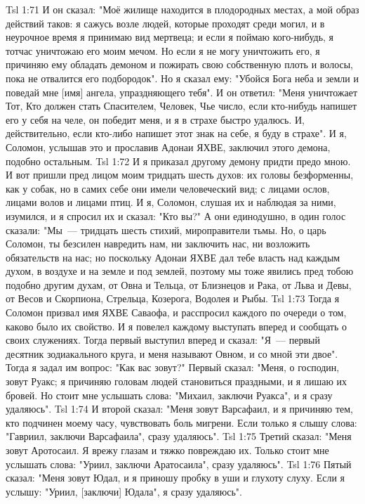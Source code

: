 \vs Tsl 1:71 
И он сказал: "Моё жилище находится в плодородных местах, а мой образ действий таков: я сажусь возле людей, которые проходят среди могил, и в неурочное время я принимаю вид мертвеца; и если я поймаю кого-нибудь, я тотчас уничтожаю его моим мечом. Но если я не могу уничтожить его, я причиняю ему обладать демоном и пожирать свою собственную плоть и волосы, пока не отвалится его подбородок". Но я сказал ему: "Убойся Бога неба и земли и поведай мне [имя] ангела, упраздняющего тебя". И он ответил: "Меня уничтожает Тот, Кто должен стать Спасителем, Человек, Чье число, если кто-нибудь напишет его у себя на челе, он победит меня, и я в страхе быстро удалюсь. И, действительно, если кто-либо напишет этот знак на себе, я буду в страхе". И я, Соломон, услышав это и прославив Адонаи ЯХВЕ, заключил этого демона, подобно остальным.
\vs Tsl 1:72 
И я приказал другому демону придти предо мною. И вот пришли пред лицом моим тридцать шесть духов: их головы безформенны, как у собак, но в самих себе они имели человеческий вид; с лицами ослов, лицами волов и лицами птиц. И я, Соломон, слушая их и наблюдая за ними, изумился, и я спросил их и сказал: "Кто вы?" А они единодушно, в один голос сказали: "Мы~--- тридцать шесть стихий, мироправители тьмы. Но, о царь Соломон, ты безсилен навредить нам, ни заключить нас, ни возложить обязательств на нас; но поскольку Адонаи ЯХВЕ дал тебе власть над каждым духом, в воздухе и на земле и под землей, поэтому мы тоже явились пред тобою подобно другим духам, от Овна и Тельца, от Близнецов и Рака, от Льва и Девы, от Весов и Скорпиона, Стрельца, Козерога, Водолея и Рыбы.
\vs Tsl 1:73 
Тогда я Соломон призвал имя ЯХВЕ Саваофа, и расспросил каждого по очереди о том, каково было их свойство. И я повелел каждому выступать вперед и сообщать о своих служениях. Тогда первый выступил вперед и сказал: "Я~--- первый десятник зодиакального круга, и меня называют Овном, и со мной эти двое". Тогда я задал им вопрос: "Как вас зовут?" Первый сказал: "Меня, о господин, зовут Руакс; я причиняю головам людей становиться праздными, и я лишаю их бровей. Но стоит мне услышать слова: "Михаил, заключи Руакса", и я сразу удаляюсь".
\vs Tsl 1:74 
И второй сказал: "Меня зовут Варсафаил, и я причиняю тем, кто подчинен моему часу, чувствовать боль мигрени. Если только я слышу слова: "Гавриил, заключи Варсафаила", сразу удаляюсь".
\vs Tsl 1:75 
Третий сказал: "Меня зовут Аротосаил. Я врежу глазам и тяжко повреждаю их. Только стоит мне услышать слова: "Уриил, заключи Аратосаила", сразу удаляюсь".
\vs Tsl 1:76 
Пятый сказал: "Меня зовут Юдал, и я приношу пробку в уши и глухоту слуху. Если я услышу: "Уриил, [заключи] Юдала", я сразу удаляюсь".
